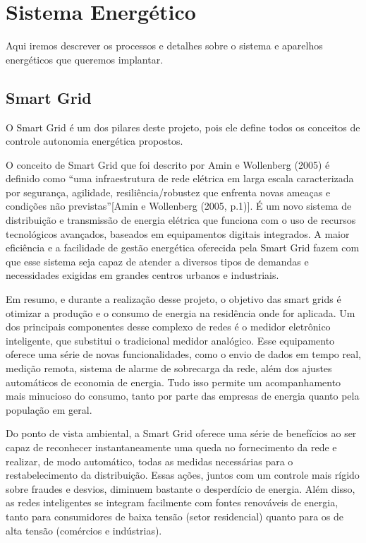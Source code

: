 \section{Sistema Energético}
\par Aqui iremos descrever os processos e detalhes sobre o sistema e aparelhos energéticos que queremos implantar.

\subsection{Smart Grid}
\par O Smart Grid é um dos pilares deste projeto, pois ele define todos os conceitos de controle autonomia energética propostos.
\par O conceito de Smart Grid que foi descrito por Amin e Wollenberg (2005) é definido como “uma infraestrutura de rede elétrica em larga escala caracterizada por segurança, agilidade, resiliência/robustez que enfrenta novas ameaças e condições não previstas”[Amin e Wollenberg (2005, p.1)]. É um novo sistema de distribuição e transmissão de energia elétrica que funciona com o uso de recursos tecnológicos avançados, baseados em equipamentos digitais integrados. A maior eficiência e a facilidade de gestão energética oferecida pela Smart Grid fazem com que esse sistema seja capaz de atender a diversos tipos de demandas e necessidades exigidas em grandes centros urbanos e industriais.
\par Em resumo, e durante a realização desse projeto, o objetivo das smart grids é otimizar a produção e o consumo de energia na residência onde for aplicada.
Um dos principais componentes desse complexo de redes é o medidor eletrônico inteligente, que substitui o tradicional medidor analógico. Esse equipamento oferece uma série de novas funcionalidades, como o envio de dados em tempo real, medição remota, sistema de alarme de sobrecarga da rede, além dos ajustes automáticos de economia de energia. Tudo isso permite um acompanhamento mais minucioso do consumo, tanto por parte das empresas de energia quanto pela população em geral.
\par Do ponto de vista ambiental, a Smart Grid oferece uma série de benefícios ao ser capaz de reconhecer instantaneamente uma queda no fornecimento da rede e realizar, de modo automático, todas as medidas necessárias para o restabelecimento da distribuição. Essas ações, juntos com um controle mais rígido sobre fraudes e desvios, diminuem bastante o desperdício de energia.  Além disso, as redes inteligentes se integram facilmente com fontes renováveis de energia, tanto para consumidores de baixa tensão (setor residencial) quanto para os de alta tensão (comércios e indústrias).

